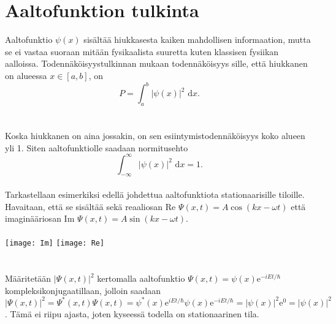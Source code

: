 \documentclass{article}
\begin{document}
\section{Aaltofunktion tulkinta}
Aaltofunktio \(\psi (x)\) sisältää hiukkasesta kaiken mahdollisen informaation, mutta se ei vastaa suoraan mitään fysikaalista suuretta kuten klassisen fysiikan aalloissa. Todennäköisyystulkinnan mukaan todennäköisyys sille, että hiukkanen on alueessa \(x\in [a, b]\), on $$P=\int_a^b |\psi (x)|^2\text{ d}x.$$\\
 \\
Koska hiukkanen on aina jossakin, on sen esiintymistodennäköisyys koko alueen yli 1. Siten aaltofunktiolle saadaan normitusehto $$\int_{-\infty}^{\infty} |\psi (x)|^2\text{ d}x=1.$$
 \\
Tarkastellaan esimerkiksi edellä johdettua aaltofunktiota stationaarisille tiloille. Havaitaan, että se sisältää sekä reaaliosan \(\text{Re } \Psi (x, t)=A\cos (kx-\omega t)\) että imaginääriosan \(\text{Im } \Psi (x, t)=A\sin (kx-\omega t)\).\\
 \\
 \texttt{[image: Im]}  \texttt{[image: Re]}\\
  \\
   \\
Määritetään \(|\Psi (x, t)|^2\) kertomalla aaltofunktio \(\Psi (x, t)=\psi (x)\text{e}^{-iEt/\hbar}\) kompleksikonjugaatillaan, jolloin saadaan \(|\Psi (x, t)|^2=\Psi ^* (x, t) \Psi (x, t)=\psi ^* (x)\text{e}^{iEt/\hbar}\psi (x)\text{e}^{-iEt/\hbar}=|\psi (x)|^2 \text{e}^0 = |\psi (x)|^2\). Tämä ei riipu ajasta, joten kyseessä todella on stationaarinen tila.

\newpage
\end{document}

